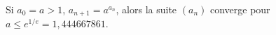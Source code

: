 Si $a_0 = a > 1$, $a_{n+1} = a^{a_n}$, alors la suite $(a_n)$ converge pour $a \leq e^{1/e} = 1{,}444667861$.
